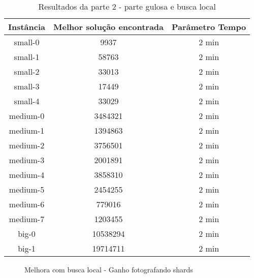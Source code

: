 \documentclass[11pt,letterpaper]{article}
\begin{document}
\begin{table}[h!]
\begin{centering}
\begin{tabular}{|c|c|c|}
\hline 
Instância & Melhor solução encontrada & Parâmetro Tempo  \tabularnewline
\hline 
\hline 
small-0 & 9937 & 2 min  \tabularnewline %
\hline 
small-1 & 58763 & 2 min  \tabularnewline %
\hline 
small-2 & 33013 & 2 min  \tabularnewline %
\hline 
small-3 & 17449 & 2 min  \tabularnewline %
\hline 
small-4 & 33029 & 2 min  \tabularnewline %
\hline 
medium-0 &  3484321 & 2 min  \tabularnewline %
\hline 
medium-1 & 1394863 & 2 min  \tabularnewline %
\hline 
medium-2 & 3756501 & 2 min  \tabularnewline %
\hline 
medium-3 & 2001891 & 2 min  \tabularnewline %
\hline 
medium-4 & 3858310 & 2 min  \tabularnewline %
\hline 
medium-5 & 2454255 & 2 min  \tabularnewline %
\hline 
medium-6 & 779016 & 2 min  \tabularnewline %
\hline 
medium-7 & 1203455 & 2 min  \tabularnewline %
\hline 
big-0 & 10538294 & 2 min  \tabularnewline %
\hline 
big-1 & 19714711 & 2 min  \tabularnewline %
\hline 

\end{tabular}
\par\end{centering}
\caption{Resultados da parte 2 - parte gulosa e busca local}
\label{tab:loc}
\end{table}


\begin{figure}
\begin{center}
\end{center}
\caption{Melhora com busca local - Ganho fotografando shards }
\label{graf:big}
\end{figure}
\end{document}
